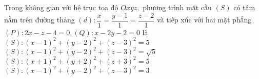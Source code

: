 \begin{ex}%
Trong không gian với hệ trục tọa độ $Oxyz, $ phương trình mặt cầu $(S)$ có tâm nằm trên đường thảng $(d): \dfrac{x}{1} = \dfrac{y - 1}{1} = \dfrac{z - 2}{1}$ và tiếp xúc với hai mặt phẳng $(P): 2x - z - 4 = 0, (Q): x - 2y - 2 = 0$ là
\choice
{\True $(S): (x - 1)^2 + (y - 2)^2+ (z - 3)^2 = 5$}
{$(S): (x - 1)^2 + (y - 2)^2 + (z - 3)^2 = \sqrt{5}$}
{$(S): (x + 1)^2+ (y + 2)^2 + (z + 3)^2 = 5$}
{$(S): (x - 1)^2 + (y - 2)^2 + (z - 3)^2 = 3$}
\end{ex}

